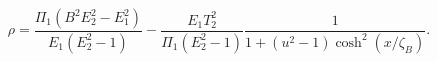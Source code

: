 \begin{equation}\label{2na}
\rho =\frac{\Pi_{1}(B^{2}E_{2}^{2}-E_{1}^{2})}{E_{1}(E_{2}^{2}-1)}
-\frac{E_{1}T_2^2}{\Pi_{1}(E_{2}^{2}-1)}
\frac{1}{1+(u^{2}-1)\cosh^{2}(x/\zeta_B)}.
\end{equation} 
